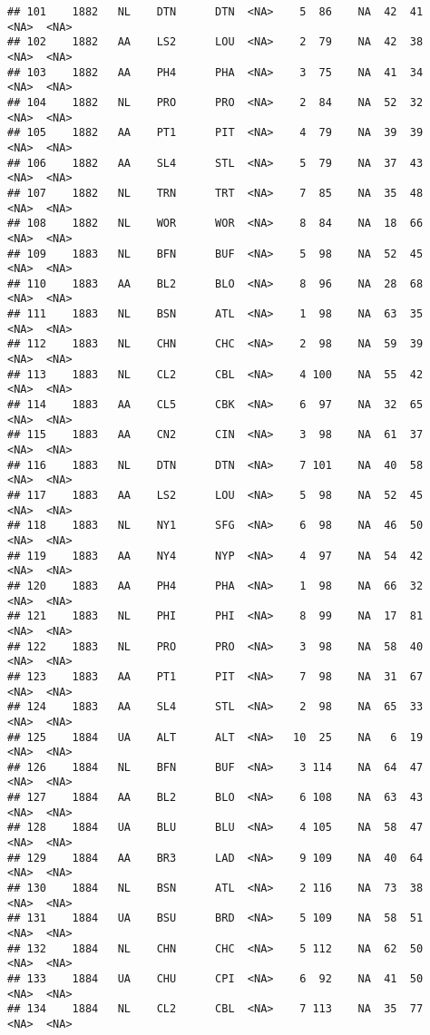 \documentclass[]{article}
\begin{document}
\begin{verbatim}
## 101    1882   NL    DTN      DTN  <NA>    5  86    NA  42  41   <NA>  <NA>
## 102    1882   AA    LS2      LOU  <NA>    2  79    NA  42  38   <NA>  <NA>
## 103    1882   AA    PH4      PHA  <NA>    3  75    NA  41  34   <NA>  <NA>
## 104    1882   NL    PRO      PRO  <NA>    2  84    NA  52  32   <NA>  <NA>
## 105    1882   AA    PT1      PIT  <NA>    4  79    NA  39  39   <NA>  <NA>
## 106    1882   AA    SL4      STL  <NA>    5  79    NA  37  43   <NA>  <NA>
## 107    1882   NL    TRN      TRT  <NA>    7  85    NA  35  48   <NA>  <NA>
## 108    1882   NL    WOR      WOR  <NA>    8  84    NA  18  66   <NA>  <NA>
## 109    1883   NL    BFN      BUF  <NA>    5  98    NA  52  45   <NA>  <NA>
## 110    1883   AA    BL2      BLO  <NA>    8  96    NA  28  68   <NA>  <NA>
## 111    1883   NL    BSN      ATL  <NA>    1  98    NA  63  35   <NA>  <NA>
## 112    1883   NL    CHN      CHC  <NA>    2  98    NA  59  39   <NA>  <NA>
## 113    1883   NL    CL2      CBL  <NA>    4 100    NA  55  42   <NA>  <NA>
## 114    1883   AA    CL5      CBK  <NA>    6  97    NA  32  65   <NA>  <NA>
## 115    1883   AA    CN2      CIN  <NA>    3  98    NA  61  37   <NA>  <NA>
## 116    1883   NL    DTN      DTN  <NA>    7 101    NA  40  58   <NA>  <NA>
## 117    1883   AA    LS2      LOU  <NA>    5  98    NA  52  45   <NA>  <NA>
## 118    1883   NL    NY1      SFG  <NA>    6  98    NA  46  50   <NA>  <NA>
## 119    1883   AA    NY4      NYP  <NA>    4  97    NA  54  42   <NA>  <NA>
## 120    1883   AA    PH4      PHA  <NA>    1  98    NA  66  32   <NA>  <NA>
## 121    1883   NL    PHI      PHI  <NA>    8  99    NA  17  81   <NA>  <NA>
## 122    1883   NL    PRO      PRO  <NA>    3  98    NA  58  40   <NA>  <NA>
## 123    1883   AA    PT1      PIT  <NA>    7  98    NA  31  67   <NA>  <NA>
## 124    1883   AA    SL4      STL  <NA>    2  98    NA  65  33   <NA>  <NA>
## 125    1884   UA    ALT      ALT  <NA>   10  25    NA   6  19   <NA>  <NA>
## 126    1884   NL    BFN      BUF  <NA>    3 114    NA  64  47   <NA>  <NA>
## 127    1884   AA    BL2      BLO  <NA>    6 108    NA  63  43   <NA>  <NA>
## 128    1884   UA    BLU      BLU  <NA>    4 105    NA  58  47   <NA>  <NA>
## 129    1884   AA    BR3      LAD  <NA>    9 109    NA  40  64   <NA>  <NA>
## 130    1884   NL    BSN      ATL  <NA>    2 116    NA  73  38   <NA>  <NA>
## 131    1884   UA    BSU      BRD  <NA>    5 109    NA  58  51   <NA>  <NA>
## 132    1884   NL    CHN      CHC  <NA>    5 112    NA  62  50   <NA>  <NA>
## 133    1884   UA    CHU      CPI  <NA>    6  92    NA  41  50   <NA>  <NA>
## 134    1884   NL    CL2      CBL  <NA>    7 113    NA  35  77   <NA>  <NA>

\end{verbatim}
\end{document}
